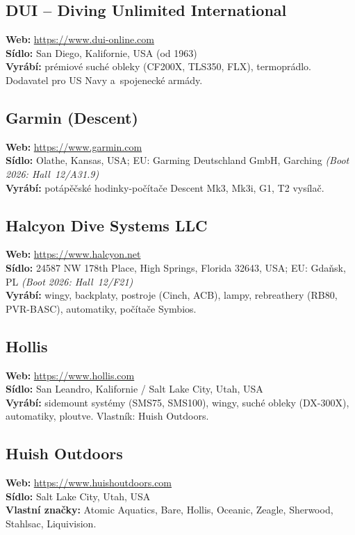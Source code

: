 \documentclass[11pt,a4paper]{article}
\begin{document}
\subsection{DUI -- Diving Unlimited International}
\textbf{Web:} \url{https://www.dui-online.com} \\
\textbf{Sídlo:} San Diego, Kalifornie, USA (od 1963) \\
\textbf{Vyrábí:} prémiové suché obleky (CF200X, TLS350, FLX), termoprádlo. Dodavatel pro US Navy a~spojenecké armády.

\subsection{Garmin (Descent)}
\textbf{Web:} \url{https://www.garmin.com} \\
\textbf{Sídlo:} Olathe, Kansas, USA; EU: Garming Deutschland GmbH, Garching \quad\emph{(Boot 2026: Hall~12/A31.9)} \\
\textbf{Vyrábí:} potápěčské hodinky-počítače Descent Mk3, Mk3i, G1, T2 vysílač.

\subsection{Halcyon Dive Systems LLC}
\textbf{Web:} \url{https://www.halcyon.net} \\
\textbf{Sídlo:} 24587 NW 178th Place, High Springs, Florida 32643, USA; EU: Gdaňsk, PL \quad\emph{(Boot 2026: Hall~12/F21)} \\
\textbf{Vyrábí:} wingy, backplaty, postroje (Cinch, ACB), lampy, rebreathery (RB80, PVR-BASC), automatiky, počítače Symbios.

\subsection{Hollis}
\textbf{Web:} \url{https://www.hollis.com} \\
\textbf{Sídlo:} San Leandro, Kalifornie / Salt Lake City, Utah, USA \\
\textbf{Vyrábí:} sidemount systémy (SMS75, SMS100), wingy, suché obleky (DX-300X), automatiky, ploutve. Vlastník: Huish Outdoors.

\subsection{Huish Outdoors}
\textbf{Web:} \url{https://www.huishoutdoors.com} \\
\textbf{Sídlo:} Salt Lake City, Utah, USA \\
\textbf{Vlastní značky:} Atomic Aquatics, Bare, Hollis, Oceanic, Zeagle, Sherwood, Stahlsac, Liquivision.
\end{document}
